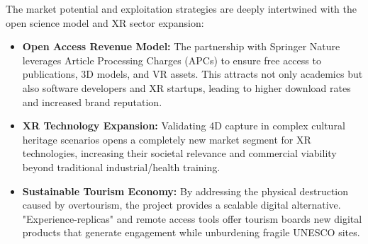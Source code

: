 \noindent
The market potential and exploitation strategies are deeply intertwined with the open science model and XR sector expansion:
\begin{itemize}
    \item \textbf{Open Access Revenue Model:} The partnership with Springer Nature leverages Article Processing Charges (APCs) to ensure free access to publications, 3D models, and VR assets. This attracts not only academics but also software developers and XR startups, leading to higher download rates and increased brand reputation.
    \item \textbf{XR Technology Expansion:} Validating 4D capture in complex cultural heritage scenarios opens a completely new market segment for XR technologies, increasing their societal relevance and commercial viability beyond traditional industrial/health training.
    \item \textbf{Sustainable Tourism Economy:} By addressing the physical destruction caused by overtourism, the project provides a scalable digital alternative. "Experience-replicas" and remote access tools offer tourism boards new digital products that generate engagement while unburdening fragile UNESCO sites.
\end{itemize}